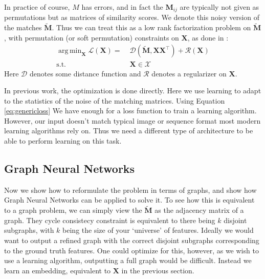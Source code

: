 \documentclass[10pt,twocolumn,letterpaper]{article}
\newcommand{\mat}[1]{\mathbf{#1}}
\DeclareMathOperator*{\argmin}{arg\,min}
\begin{document}
In practice of course, $M$ has errors, and in fact the $\mat{M}_{ij}$ are typically not given as permutations but as matrices of similarity scores.
We denote this noisy version of the matches $\widetilde{\mat{M}}$.
Thus we can treat this as a low rank factorization problem on $\widetilde{\mat{M}}$, with permutation (or soft permutation) constraints on $\mat{X}$, as done in \cite{zhou2015multi, leonardos2016distributed, pachauri2013solving}:
\begin{align}
\argmin_{\mat{X}} \mathcal{L}(\mat{X})
=&\; \mathcal{D}\left(\widetilde{\mat{M}}, \mat{X}\mat{X}^\top\right) + \mathcal{R}(\mat{X}) \nonumber \\
\mathrm{s.t.} &\; \mat{X} \in \mathcal{X} \label{eq:genericloss}
\end{align}
Here $\mathcal{D}$ denotes some distance function and $\mathcal{R}$ denotes a regularizer on $\mat{X}$.

In previous work, the optimization is done directly.
Here we use learning to adapt to the statistics of the noise of the matching matrices.
Using Equation \ref{eq:genericloss} We have enough for a loss function to train a learning algorithm.
However, our input doesn't match typical image or sequence format most modern learning algorithms rely on.
Thus we need a different type of architecture to be able to perform learning on this task.

\subsection{Graph Neural Networks}
Now we show how to reformulate the problem in terms of graphs, and show how Graph Neural Networks can be applied to solve it.
To see how this is equivalent to a graph problem, we can simply view the $\widetilde{\mat{M}}$ as the adjacency matrix of a graph.
They cycle consistecy constraint is equivalent to there being $k$ disjoint subgraphs, with $k$ being the size of your `universe' of features. 
Ideally we would want to output a refined graph with the correct disjoint subgraphs corresponding to the ground truth features.
One could optimize for this, however, as we wish to use a learning algorithm, outputting a full graph would be difficult.
Instead we learn an embedding, equivalent to $\mat{X}$ in the previous section.
\end{document}
